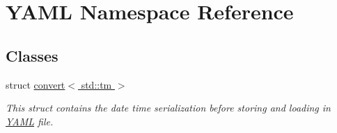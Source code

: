 \hypertarget{namespace_y_a_m_l}{}\section{Y\+A\+M\+L Namespace Reference}
\label{namespace_y_a_m_l}
\subsection*{Classes}
\begin{DoxyCompactItemize}
\item 
struct \hyperlink{struct_y_a_m_l_1_1convert_3_01std_1_1tm_01_4}{convert$<$ std\+::tm $>$}
\begin{DoxyCompactList}\small\item\em This struct contains the date time serialization before storing and loading in \hyperlink{namespace_y_a_m_l}{Y\+A\+M\+L} file. \end{DoxyCompactList}\end{DoxyCompactItemize}
